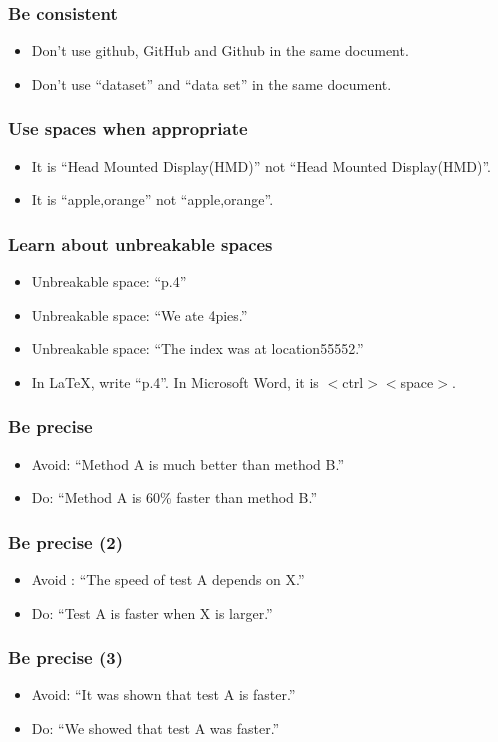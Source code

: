 \documentclass[handout]{beamer}
\begin{document}
\frame
{
  \frametitle{Be consistent}

 \begin{itemize}
  \item<1->  Don't use github, GitHub and Github in the same document.
  \item<2->  Don't use ``dataset'' and ``data set'' in the same document.
 \end{itemize}
 }

\frame
{
  \frametitle{Use spaces when appropriate}

 \begin{itemize}
  \item<1->  It is ``Head Mounted Display(HMD)'' not  ``Head Mounted Display(HMD)''.
  \item<2->  It is ``apple,orange'' not  ``apple,orange''.
 \end{itemize}
 }


\frame
{
  \frametitle{Learn about unbreakable spaces}

 \begin{itemize}
  \item<1->  Unbreakable space: ``p.4''
  \item<2->  Unbreakable space: ``We ate 4pies.''
  \item<2->  Unbreakable space: ``The index was at location55552.''
  \item<3->  In \LaTeX{}, write ``p.\texttildelow{}4''. In Microsoft Word, it is $<$ctrl$><$space$>$.
 \end{itemize}
 }

\frame
{
  \frametitle{Be precise}
  \begin{itemize}
  \item<1->  Avoid: ``Method A is much better than method B.''
  \item<2->  Do: ``Method A is 60\% faster than method B.''
 \end{itemize}
 }

 \frame
{
  \frametitle{Be precise (2)}
  \begin{itemize}
  \item<1-> Avoid : ``The speed of test A depends on X.''
  \item<2->  Do: ``Test A is faster when X is larger.''
 \end{itemize}
 }

 \frame
{
  \frametitle{Be precise (3)}
  \begin{itemize}
 \item<1->           Avoid: ``It was shown that test A is faster.''
  \item<2-> Do: ``We showed that test A was faster.''
 \end{itemize}
 }
\end{document}
